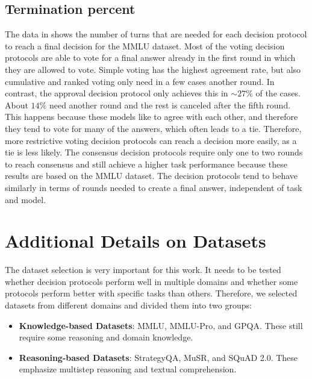 \subsection{Termination percent}
\label{app:termination_percent}
The data in  shows the number of turns that are needed for each decision protocol to reach a final decision for the MMLU dataset. Most of the voting decision protocols are able to vote for a final answer already in the first round in which they are allowed to vote. Simple voting has the highest agreement rate, but also cumulative and ranked voting only need in a few cases another round. In contrast, the approval decision protocol only achieves this in $\sim27\%$ of the cases. About $14\%$ need another round and the rest is canceled after the fifth round. This happens because these models like to agree with each other, and therefore they tend to vote for many of the answers, which often leads to a tie. Therefore, more restrictive voting decision protocols can reach a decision more easily, as a tie is less likely. 
The consensus decision protocols require only one to two rounds to reach consensus and still achieve a higher task performance because these results are based on the MMLU dataset. The decision protocols tend to behave similarly in terms of rounds needed to create a final answer, independent of task and model.



\section{Additional Details on Datasets}
\label{appendix:datasets}

The dataset selection is very important for this work. It needs to be tested whether decision protocols perform well in multiple domains and whether some protocols perform better with specific tasks than others. Therefore, we selected datasets from different domains and divided them into two groups:

\begin{itemize}
    \item \textbf{Knowledge-based Datasets}: MMLU, MMLU-Pro, and GPQA. These still require some reasoning and domain knowledge.
    \item \textbf{Reasoning-based Datasets}: StrategyQA, MuSR, and SQuAD 2.0. These emphasize multistep reasoning and textual comprehension.
\end{itemize}

